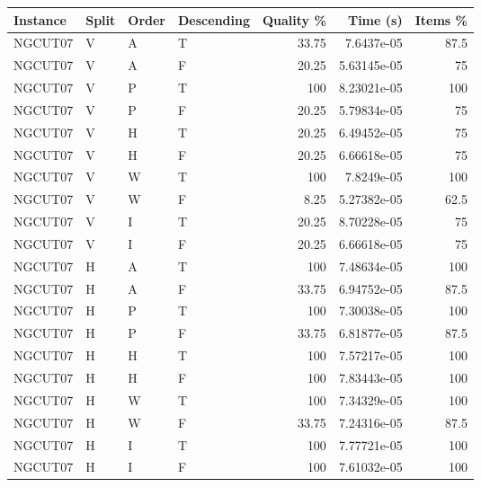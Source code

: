 \begin{tabular}{llllrrr}
    \hline
    Instance & Split & Order & Descending & Quality \% & Time (s)    & Items \% \\
    \hline
    NGCUT07  & V     & A     & T          & 33.75      & 7.6437e-05  & 87.5     \\
    NGCUT07  & V     & A     & F          & 20.25      & 5.63145e-05 & 75       \\
    NGCUT07  & V     & P     & T          & 100        & 8.23021e-05 & 100      \\
    NGCUT07  & V     & P     & F          & 20.25      & 5.79834e-05 & 75       \\
    NGCUT07  & V     & H     & T          & 20.25      & 6.49452e-05 & 75       \\
    NGCUT07  & V     & H     & F          & 20.25      & 6.66618e-05 & 75       \\
    NGCUT07  & V     & W     & T          & 100        & 7.8249e-05  & 100      \\
    NGCUT07  & V     & W     & F          & 8.25       & 5.27382e-05 & 62.5     \\
    NGCUT07  & V     & I     & T          & 20.25      & 8.70228e-05 & 75       \\
    NGCUT07  & V     & I     & F          & 20.25      & 6.66618e-05 & 75       \\
    NGCUT07  & H     & A     & T          & 100        & 7.48634e-05 & 100      \\
    NGCUT07  & H     & A     & F          & 33.75      & 6.94752e-05 & 87.5     \\
    NGCUT07  & H     & P     & T          & 100        & 7.30038e-05 & 100      \\
    NGCUT07  & H     & P     & F          & 33.75      & 6.81877e-05 & 87.5     \\
    NGCUT07  & H     & H     & T          & 100        & 7.57217e-05 & 100      \\
    NGCUT07  & H     & H     & F          & 100        & 7.83443e-05 & 100      \\
    NGCUT07  & H     & W     & T          & 100        & 7.34329e-05 & 100      \\
    NGCUT07  & H     & W     & F          & 33.75      & 7.24316e-05 & 87.5     \\
    NGCUT07  & H     & I     & T          & 100        & 7.77721e-05 & 100      \\
    NGCUT07  & H     & I     & F          & 100        & 7.61032e-05 & 100      \\

\end{tabular}

